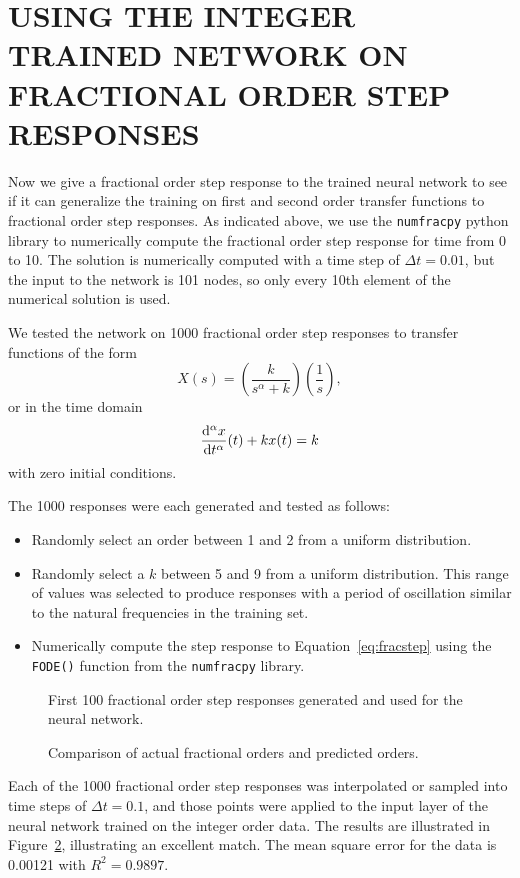 \section{USING THE INTEGER TRAINED NETWORK ON FRACTIONAL ORDER STEP RESPONSES}
\label{sec:generalize}

Now we give a fractional order step response to the trained neural network to
see if it can generalize the training on first and second order transfer
functions to fractional order step responses. As indicated above, we use the
\texttt{numfracpy} python library to numerically compute the fractional order
step response for time from 0 to 10. The solution is numerically computed with a
time step of $\Delta t = 0.01$, but the input to the network is 101 nodes, so
only every 10th element of the numerical solution is used.

We tested the network on 1000 fractional order step responses to transfer
functions of the form
\[
  X(s) = \left( \frac{k}{s^\alpha + k} \right) \left( \frac{1}{s} \right),
\]
or in the time domain
\begin{equation}
\frac{\mathrm{d}^\alpha x}{\mathrm{d} t^\alpha}(t) + k x(t) = k
\label{eq:fracstep}
\end{equation}
with zero initial conditions. 

The 1000 responses were each generated and tested as follows: 
\begin{itemize}
\item Randomly select an order between 1 and 2 from a uniform distribution.
\item Randomly select a $k$ between 5 and 9 from a uniform distribution. This
  range of values was selected to produce responses with a period of oscillation
  similar to the natural frequencies in the training set.
\item Numerically compute the step response to Equation~\ref{eq:fracstep} using
the \texttt{FODE()} function from the \texttt{numfracpy} library. 
\end{itemize}

\begin{figure}
\centering

\vspace*{-5pt}
\caption{First 100 fractional order step responses generated and used for the
neural network.}
\label{fig:accuracy}
\end{figure}


\begin{figure}
\centering

\vspace*{-5pt}
\caption{Comparison of actual fractional orders and predicted orders.}
\label{fig:accuracy}
\end{figure}

Each of the 1000 fractional order step responses was interpolated or sampled
into time steps of $\Delta t = 0.1$, and those points were applied to the input
layer of the neural network trained on the integer order data. The results are
illustrated in Figure~\ref{fig:accuracy}, illustrating an excellent match. The
mean square error for the data is 0.00121 with $R^2 = 0.9897$. 

